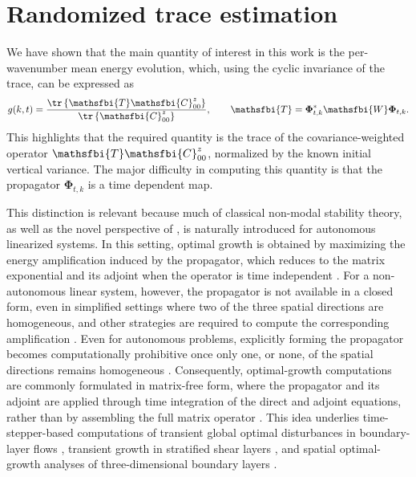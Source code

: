 \section{Randomized trace estimation}
\label{sec:randomized_trace_estimation}
We have shown that the main quantity of interest in this work is the per-wavenumber mean energy evolution, which, using the cyclic invariance of the trace, can be expressed as
\begin{equation}
    g(k,t)
    =
    \frac{
      \tr
      \left\{
        \mathsfbi{T}\mathsfbi{C}_{00}^{z}
      \right\}
    }{
      \tr
      \left\{
        \mathsfbi{C}_{00}^{z}
      \right\}
    },
    \qquad
    \mathsfbi{T}
    =
    \boldsymbol{\Phi}_{t,k}^{*}\mathsfbi{W}\boldsymbol{\Phi}_{t,k}.
    \label{eq:T_operator_definition}
\end{equation}
This highlights that the required quantity is the trace of the covariance-weighted operator \(\mathsfbi{T}\mathsfbi{C}_{00}^{z}\), normalized by the known initial vertical variance. The major difficulty in computing this quantity is that the propagator \(\boldsymbol{\Phi}_{t,k}\) is a time dependent map.

This distinction is relevant because much of classical non-modal stability theory, as well as the novel perspective of \citet{frame-towne-2024}, is naturally introduced for autonomous linearized systems. In this setting, optimal growth is obtained by maximizing the energy amplification induced by the propagator, which reduces to the matrix exponential and its adjoint when the operator is time independent \citep{schmid-henningson-2001}. For a non-autonomous linear system, however, the propagator is not available in a closed form, even in simplified settings where two of the three spatial directions are homogeneous, and other strategies are required to compute the corresponding amplification \citep{schmid-2007,rapaka-et-al-2008}. Even for autonomous problems, explicitly forming the propagator becomes computationally prohibitive once only one, or none, of the spatial directions remains homogeneous \citep{theofilis-2011}. Consequently, optimal-growth computations are commonly formulated in matrix-free form, where the propagator and its adjoint are applied through time integration of the direct and adjoint equations, rather than by assembling the full matrix operator \citep{luchini-2000,luchini-bottaro-2014}. This idea underlies time-stepper-based computations of transient global optimal disturbances in boundary-layer flows \citep{monokrousos-et-al-2010}, transient growth in stratified shear layers \citep{kaminski-caulfield-taylor-2014}, and spatial optimal-growth analyses of three-dimensional boundary layers \citep{templemann-hanifi-henningson-2010}.

